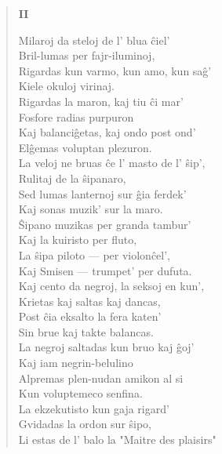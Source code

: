 \begin{verse}
\begin{center}
\textbf{II}
\end{center}

                 \vin   Milaroj da steloj de l' blua \^ciel'\\
                 Bril-lumas per fajr-iluminoj,\\
                 Rigardas kun varmo, kun amo, kun sa\^g'\\
                 Kiele okuloj virinaj.\\
                 \vin   Rigardas la maron, kaj tiu \^ci mar'\\
                 Fosfore radias purpuron\\
                 Kaj balanci\^getas, kaj ondo post ond'\\
                 El\^gemas voluptan plezuron.\\
                 \vin   La veloj ne bruas \^ce l' masto de l' \^sip',\\
                 Rulitaj de la \^sipanaro,\\
                 Sed lumas lanternoj sur \^gia ferdek'\\
                 Kaj sonas muzik' sur la maro.\\
                  \vin  \^Sipano muzikas per granda tambur'\\
                 Kaj la kuiristo per fluto,\\
                 La \^sipa piloto --- per violon\^cel',\\
                 Kaj Smisen --- trumpet' per dufuta.\\
                  \vin  Kaj cento da negroj, la seksoj en kun',\\
                 Krietas kaj saltas kaj dancas,\\
                 Post \^cia eksalto la fera katen'\\
                 Sin brue kaj takte balancas.\\
                  \vin  La negroj saltadas kun bruo kaj \^goj'\\
                 Kaj iam negrin-belulino\\
                 Alpremas plen-nudan amikon al si\\
                 Kun voluptemeco senfina.\\
                  \vin  La ekzekutisto kun gaja rigard'\\
                 Gvidadas la ordon sur \^sipo,\\
                 Li estas de l' balo la "Maitre des plaisirs"\\

\end{verse}
